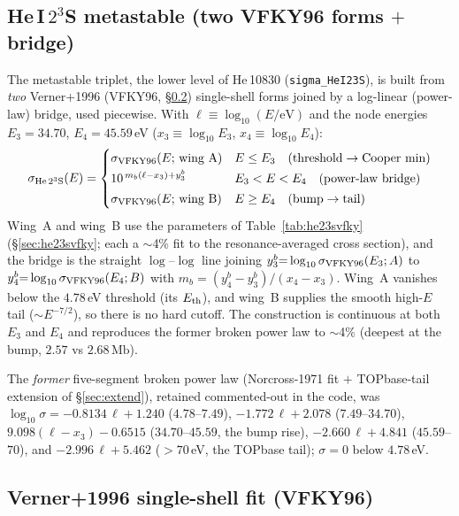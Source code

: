 \documentclass[english,a4paper]{my_memo}
\newcommand{\Mb}{\mathrm{Mb}}
\newcommand{\sig}{\sigma}
\begin{document}
\subsection{He\,I\,$2^3$S metastable (two VFKY96 forms $+$ bridge)}

The metastable triplet, the lower level of He\,10830
(\texttt{sigma\_HeI23S}), is built from \emph{two} Verner+1996 (VFKY96,
\S\ref{sec:vfky}) single-shell forms joined by a log-linear (power-law)
bridge, used piecewise. With $\ell\equiv\log_{10}(E/\mathrm{eV})$ and the
node energies $E_3{=}34.70$, $E_4{=}45.59\,$eV ($x_3{\equiv}\log_{10}E_3$,
$x_4{\equiv}\log_{10}E_4$):
\begin{equation}
\sig_{\rm He\,2^3S}(E) =
\begin{cases}
\sig_{\rm VFKY96}(E;\,\text{wing A}) & E\le E_3\quad(\text{threshold}\to\text{Cooper min})\\[2pt]
10^{\,m_b(\ell-x_3)+y_3^{b}} & E_3<E<E_4\quad(\text{power-law bridge})\\[2pt]
\sig_{\rm VFKY96}(E;\,\text{wing B}) & E\ge E_4\quad(\text{bump}\to\text{tail})
\end{cases}
\label{eq:he23s}
\end{equation}
Wing~A and wing~B use the parameters of Table~\ref{tab:he23svfky}
(\S\ref{sec:he23svfky}; each a $\sim$4\% fit to the resonance-averaged
cross section), and the bridge is the straight $\log$--$\log$ line joining
$y_3^{b}{=}\log_{10}\sig_{\rm VFKY96}(E_3;A)$ to
$y_4^{b}{=}\log_{10}\sig_{\rm VFKY96}(E_4;B)$ with
$m_b{=}(y_4^{b}-y_3^{b})/(x_4-x_3)$. Wing~A vanishes below the $4.78\,$eV
threshold (its $E_{\rm th}$), and wing~B supplies the smooth high-$E$ tail
($\sim E^{-7/2}$), so there is no hard cutoff. The construction is
continuous at both $E_3$ and $E_4$ and reproduces the former broken power
law to $\sim$4\% (deepest at the bump, $2.57$ vs $2.68\,\Mb$).

The \emph{former} five-segment broken power law (Norcross-1971 fit $+$
TOPbase-tail extension of \S\ref{sec:extend}), retained commented-out in
the code, was $\log_{10}\sig = -0.8134\,\ell{+}1.240$ ($4.78$--$7.49$),
$-1.772\,\ell{+}2.078$ ($7.49$--$34.70$), $9.098(\ell{-}x_3){-}0.6515$
($34.70$--$45.59$, the bump rise), $-2.660\,\ell{+}4.841$
($45.59$--$70$), and $-2.996\,\ell{+}5.462$ ($>70\,$eV, the TOPbase tail);
$\sig{=}0$ below $4.78\,$eV.

\subsection{Verner+1996 single-shell fit (VFKY96)}\label{sec:vfky}
\end{document}
